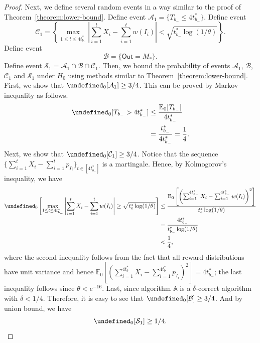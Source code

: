 \documentclass{article}
\newcommand{\E}{\mathbb E}
\newcommand{\out}{\mathsf{Out}}
\let\Pr\undefined
\DeclareMathOperator{\Pr}{Pr}
\begin{document}
\begin{proof}
Next, we define several random events in a way similar to the proof of Theorem~\ref{theorem:lower-bound}.
Define event
$\mathcal A_1 = \{T_{b_-} \le 4t_{b_-}^* \}$.
Define event 
$$
\mathcal C_1 = \left\{\max_{1\le t \le 4t_{b_-}^*} \left|\sum_{i=1}^t X_i - \sum_{i=1}^t w(I_i)\right|  < \sqrt{t_{b_-}^*\log(1/\theta)} \right\}.
$$
Define event 
\begin{equation}
\label{eq:lower-sum-b-define}
\mathcal B = \{\out=M_*\}.
\end{equation}
Define event
$\mathcal S_1 = \mathcal A_1 \cap \mathcal B \cap \mathcal C_1$.
Then, we bound the probability of events $\mathcal A_1$, $\mathcal B$, $\mathcal C_1$ and $\mathcal S_1$ under $H_0$ using methods similar to Theorem~\ref{theorem:lower-bound}.
First, we show that $\Pr_0[\mathcal A_1] \ge 3/4$. 
This can be proved by Markov inequality as follows.
\begin{align*}
\Pr_0[T_{b_-} > 4t_{b_-}^*] &\le \frac{\E_0[T_{b_-}]}{4t_{b_-}^*} \\
					  &= \frac{t_{b_-}^*}{4t_{b_-}^*} = \frac14.
\end{align*}
Next, we show that $\Pr_0[\mathcal C_1] \ge 3/4$.
Notice that the sequence $\Big\{\sum_{i=1}^t X_i - \sum_{i=1}^t p_{I_i}\Big\}_{t\in[4t_{b_-}^*]}$ is a martingale.
Hence, by Kolmogorov's inequality, we have
\begin{align*}
\Pr_0\left[\max_{1\le t \le 4t_{b_-}^*} \left|\sum_{i=1}^t X_i - \sum_{i=1}^t w(I_i) \right| \ge \sqrt{t_e^*\log(1/\theta)} \right]
&\le \frac{\E_0\left[ \left(\sum_{i=1}^{4t_{b_-}^*} X_i - \sum_{i=1}^{4t_{b_-}^*} w(I_i)\right)^2\right]}{t_e^*\log(1/\theta)}\\
&= \frac{4t_{b_-}^*}{t_{b_-}^*\log(1/\theta)}\\
&< \frac14,
\end{align*}
where the second inequality follows from the fact that all reward distributions have unit variance and hence
$\E_0\left[ \left(\sum_{i=1}^{4t_{b_-}^*} X_i - \sum_{i=1}^{4t_{b_-}^*} p_{I_i}\right)^2\right] = 4t_{b_-}^*$; the last inequality follows 
since $\theta < e^{-16}$.
Last, since algorithm $\mathbb A$ is a $\delta$-correct algorithm with $\delta < 1/4$. 
Therefore, it is easy to see that 
$\Pr_0[\mathcal B] \ge 3/4$.
And by union bound, we have
$$
\Pr_0[\mathcal S_1] \ge 1/4.
$$


\end{proof}
\end{document}
